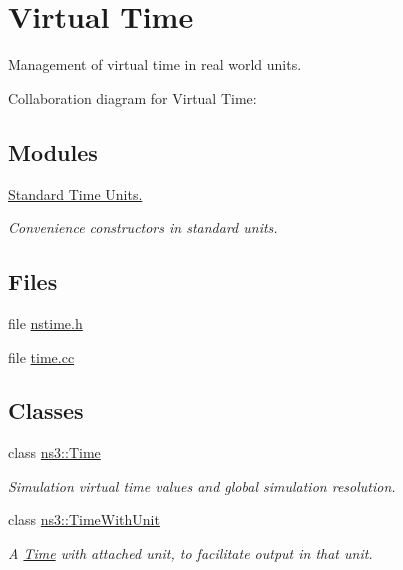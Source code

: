 \hypertarget{group__time}{}\section{Virtual Time}
\label{group__time}


Management of virtual time in real world units.  


Collaboration diagram for Virtual Time\+:
\subsection*{Modules}
\begin{DoxyCompactItemize}
\item 
\hyperlink{group__timecivil}{Standard Time Units.}
\begin{DoxyCompactList}\small\item\em Convenience constructors in standard units. \end{DoxyCompactList}\end{DoxyCompactItemize}
\subsection*{Files}
\begin{DoxyCompactItemize}
\item 
file \hyperlink{nstime_8h}{nstime.\+h}
\item 
file \hyperlink{time_8cc}{time.\+cc}
\end{DoxyCompactItemize}
\subsection*{Classes}
\begin{DoxyCompactItemize}
\item 
class \hyperlink{classns3_1_1Time}{ns3\+::\+Time}
\begin{DoxyCompactList}\small\item\em Simulation virtual time values and global simulation resolution. \end{DoxyCompactList}\item 
class \hyperlink{classns3_1_1TimeWithUnit}{ns3\+::\+Time\+With\+Unit}
\begin{DoxyCompactList}\small\item\em A \hyperlink{classns3_1_1Time}{Time} with attached unit, to facilitate output in that unit. \end{DoxyCompactList}\end{DoxyCompactItemize}
